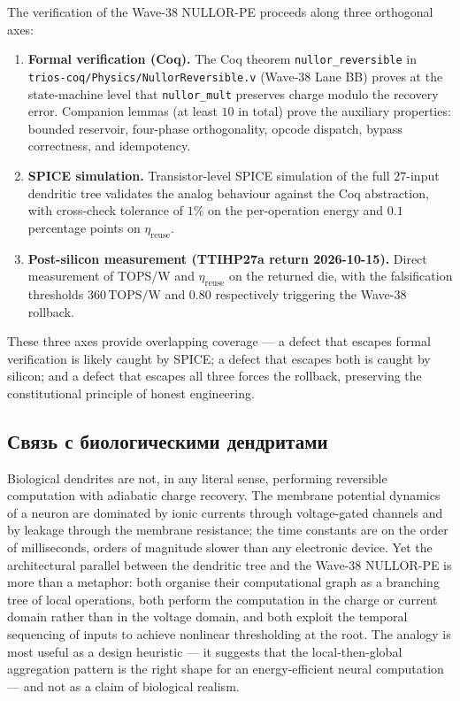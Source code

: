 The verification of the Wave-38 NULLOR-PE proceeds along three orthogonal axes:
\begin{enumerate}
  \item \textbf{Formal verification (Coq).}  The Coq theorem
    \texttt{nullor\_reversible} in
    \texttt{trios-coq/Physics/NullorReversible.v} (Wave-38 Lane BB) proves at the
    state-machine level that \texttt{nullor\_mult} preserves charge modulo the
    recovery error.  Companion lemmas (at least $10$ in total) prove the auxiliary
    properties: bounded reservoir, four-phase orthogonality, opcode dispatch,
    bypass correctness, and idempotency.
  \item \textbf{SPICE simulation.}  Transistor-level SPICE simulation of the
    full $27$-input dendritic tree validates the analog behaviour against the
    Coq abstraction, with cross-check tolerance of $1\%$ on the per-operation
    energy and $0.1$ percentage points on $\eta_{\text{reuse}}$.
  \item \textbf{Post-silicon measurement (TTIHP27a return 2026-10-15).}
    Direct measurement of TOPS/W and $\eta_{\text{reuse}}$ on the returned die,
    with the falsification thresholds $360\,\text{TOPS/W}$ and $0.80$
    respectively triggering the Wave-38 rollback.
\end{enumerate}
These three axes provide overlapping coverage --- a defect that escapes formal
verification is likely caught by SPICE; a defect that escapes both is caught by
silicon; and a defect that escapes all three forces the rollback, preserving the
constitutional principle of honest engineering.

\subsection{Связь с биологическими дендритами}
\label{subsec:biology_link}

Biological dendrites are not, in any literal sense, performing reversible computation
with adiabatic charge recovery.  The membrane potential dynamics of a neuron are
dominated by ionic currents through voltage-gated channels and by leakage through
the membrane resistance; the time constants are on the order of milliseconds,
orders of magnitude slower than any electronic device.  Yet the architectural
parallel between the dendritic tree and the Wave-38 NULLOR-PE is more than a
metaphor: both organise their computational graph as a branching tree of local
operations, both perform the computation in the charge or current domain rather
than in the voltage domain, and both exploit the temporal sequencing of inputs to
achieve nonlinear thresholding at the root.  The analogy is most useful as a design
heuristic --- it suggests that the local-then-global aggregation pattern is the
right shape for an energy-efficient neural computation --- and not as a claim of
biological realism.

